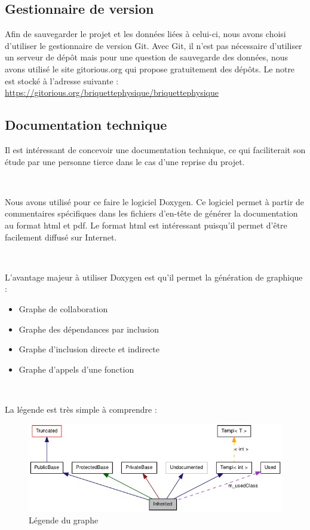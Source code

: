\documentclass[frenchb,twoside]{EPURapport}
\begin{document}
			
		\subsection{Gestionnaire de version}
		Afin de sauvegarder le projet et les données liées à celui-ci, nous avons
		choisi d'utiliser le gestionnaire de version Git.
		Avec Git, il n'est pas nécessaire d'utiliser un serveur de dépôt mais
		pour une question de sauvegarde des données, nous avons utilisé le site
		gitorious.org qui propose gratuitement des dépôts.
		Le notre est stocké à l'adresse suivante : \url{https://gitorious.org/briquettephysique/briquettephysique}
		
		\subsection{Documentation technique}
		
		Il est intéressant de concevoir une documentation technique, ce qui faciliterait
		son étude par une personne tierce dans le cas d'une reprise du projet.
		
		\
		
		Nous avons utilisé pour ce faire le logiciel Doxygen.
		Ce logiciel permet à partir de commentaires spécifiques dans les fichiers d'en-tête
		de générer la documentation au format html et pdf.
		Le format html est intéressant puisqu'il permet d'être facilement diffusé sur Internet.
		
		\
		
		L'avantage majeur à utiliser Doxygen est qu'il permet la génération de graphique :
		\begin{itemize}
			\item Graphe de collaboration
			\item Graphe des dépendances par inclusion
			\item Graphe d'inclusion directe et indirecte
			\item Graphe d'appels d'une fonction
		\end{itemize}
		
        \
		
		La légende est très simple à comprendre :
		\begin{figure}[h]
			\centering
			\includegraphics[width=12cm]{images/graph_legend.png}
			\caption{\label{fig:graph_legend}Légende du graphe}
		\end{figure}
		
\end{document}
